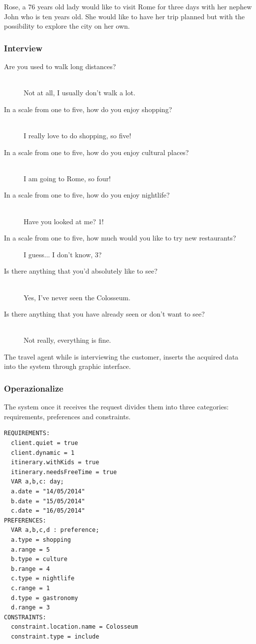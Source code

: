 \documentclass[11pt]{article} %
\begin{document}
Rose, a 76 years old lady would like to visit Rome for three days with her nephew John who is ten years old. She would like to have her trip planned but with the possibility to explore the city on her own. 

\subsubsection{Interview}

\begin{description}
  \item[Are you used to walk long distances?] \hfill \\
  Not at all, I usually don't walk a lot.
  \item[In a scale from one to five, how do you enjoy shopping?] \hfill \\
  I really love to do shopping, so five!
  \item[In a scale from one to five, how do you enjoy cultural places?] \hfill \\
  I am going to Rome, so four!
  \item[In a scale from one to five, how do you enjoy nightlife?] \hfill \\
  Have you looked at me? 1!
  \item[In a scale from one to five, how much would you like to try new restaurants?] \hfill 
  I guess... I don't know, 3?
  \item[Is there anything that you'd absolutely like to see?] \hfill \\
  Yes, I've never seen the Colosseum.
  \item[Is there anything that you have already seen or don't want to see?] \hfill \\
  Not really, everything is fine.
\end{description}

The travel agent while is interviewing the customer, inserts the acquired data into the system through graphic interface.

\subsubsection{Operazionalize}
The system once it receives the request divides them into three categories: requirements, preferences and constraints.

\begin{lstlisting}[breaklines=true,mathescape=true]
REQUIREMENTS:
  client.quiet = true
  client.dynamic = 1
  itinerary.withKids = true
  itinerary.needsFreeTime = true
  VAR a,b,c: day;
  a.date = "14/05/2014"
  b.date = "15/05/2014"
  c.date = "16/05/2014"
PREFERENCES:
  VAR a,b,c,d : preference;
  a.type = shopping
  a.range = 5
  b.type = culture
  b.range = 4
  c.type = nightlife
  c.range = 1
  d.type = gastronomy
  d.range = 3
CONSTRAINTS:
  constraint.location.name = Colosseum
  constraint.type = include
\end{lstlisting}
\end{document}
